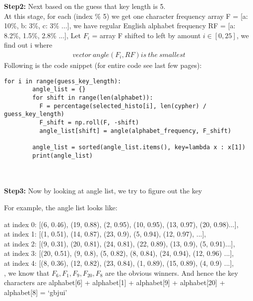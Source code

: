 \documentclass[12pt,letterpaper]{article}
\begin{document}
    \textbf{Step2:} Next based on the guess that key length is 5.\\ At this stage, for each (index \% 5) we get one character frequency array F = [a: 10\%, b: 3\%, c: 3\% ...], we have regular English alphabet frequency RF = [a: 8.2\%, 1.5\%, 2.8\% ...], Let $F_i$ = array F shifted to left by amount $i\in [0, 25]$, we find out i where
    \begin{align*}
      vector \ angle(F_i, RF) is \ the \ smallest
    \end{align*}
    Following is the code snippet (for entire code see last few pages):
    \begin{lstlisting}[style = Python]
      for i in range(guess_key_length):
        angle_list = {}
        for shift in range(len(alphabet)):
          F = percentage(selected_histo[i], len(cypher) / guess_key_length)
          F_shift = np.roll(F, -shift)
          angle_list[shift] = angle(alphabet_frequency, F_shift)

        angle_list = sorted(angle_list.items(), key=lambda x : x[1])
        print(angle_list)
    \end{lstlisting}\\ \\ 
    \textbf{Step3:} Now by looking at angle list, we try to figure out the key
    
    For example, the angle list looks like:
     
    at index 0: [(6, 0.46), (19, 0.88), (2, 0.95), (10, 0.95), (13, 0.97), (20, 0.98)...], \\
    at index 1: [(1, 0.51), (14, 0.87), (23, 0.9), (5, 0.94), (12, 0.97), ...], \\
    at index 2: [(9, 0.31), (20, 0.81), (24, 0.81), (22, 0.89), (13, 0.9), (5, 0.91)...], \\
    at index 3: [(20, 0.51), (9, 0.8), (5, 0.82), (8, 0.84), (24, 0.94), (12, 0.96) ...], \\
    at index 4: [(8, 0.36), (12, 0.82), (23, 0.84), (1, 0.89), (15, 0.89), (4, 0.9) ...], \\
    , we know that $F_6, F_1, F_9, F_{20}, F_8$  are the obvious winners. And hence the key characters are alphabet[6] + alphabet[1] + alphabet[9] + alphabet[20] + alphabet[8] = `gbjui'
\end{document}
